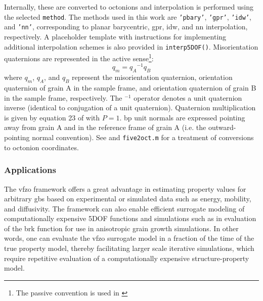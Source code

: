 \documentclass[final,twocolumn,12pt]{elsarticle}
\begin{document}
Internally, these are converted to octonions and interpolation is performed using the selected \texttt{method}. The methods used in this work are \texttt{'pbary'}, \texttt{'gpr'}, \texttt{'idw'}, and \texttt{'nn'}, corresponding to planar barycentric, \gls{gpr}, \gls{idw}, and \gls{nn} interpolation, respectively. A placeholder template with instructions for implementing additional interpolation schemes is also provided in \texttt{interp5DOF()}. Misorientation quaternions are represented in the active sense\footnote{The passive convention is used in \cite{francisGeodesicOctonionMetric2019}}:
\begin{equation}
    q_m = {q_A}^{-1}q_B
\end{equation}
where $q_m$, $q_A$, and $q_B$ represent the misorientation quaternion, orientation quaternion of grain A in the sample frame, and orientation quaternion of grain B in the sample frame, respectively. The $^{-1}$ operator denotes a unit quaternion inverse (identical to conjugation of a unit quaternion). Quaternion multiplication is given by equation 23 of \cite{rowenhorstConsistentRepresentationsConversions2015} with $P=1$. \Gls{bp} unit normals are expressed pointing away from grain A and in the reference frame of grain A (i.e. the outward-pointing normal convention). See \cite{francisGeodesicOctonionMetric2019} and \texttt{five2oct.m} \cite{bairdFiveDegreeofFreedom5DOF2020} for a treatment of conversions to octonion coordinates.

\subsubsection{Applications}

The \gls{vfzo} framework offers a great advantage in estimating property values for arbitrary \glspl{gb} based on experimental or simulated data such as energy, mobility, and diffusivity. The framework can also enable efficient surrogate modeling of computationally expensive 5DOF functions and simulations such as in evaluation of the \gls{brk} function \cite{bulatovGrainBoundaryEnergy2014} for use in anisotropic grain growth simulations. In other words, one can evaluate the \gls{vfzo} surrogate model in a fraction of the time of the true property model, thereby facilitating larger scale iterative simulations, which require repetitive evaluation of a computationally expensive structure-property model.

\end{document}
